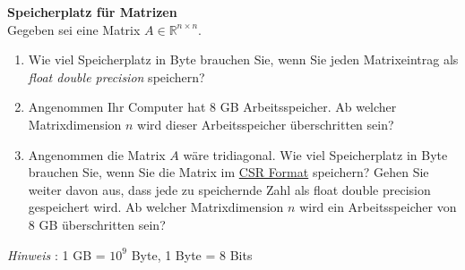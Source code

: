 \textbf{Speicherplatz für Matrizen}\\
Gegeben sei eine Matrix $A \in \mathbb{R}^{n \times n}$. 
\begin{enumerate}
	\item Wie viel Speicherplatz in Byte brauchen Sie, wenn Sie jeden Matrixeintrag als \textit{float double precision} speichern?
	\item Angenommen Ihr Computer hat 8 GB Arbeitsspeicher. Ab welcher Matrixdimension $n$ wird dieser Arbeitsspeicher überschritten sein?
	\item Angenommen die Matrix $A$ wäre tridiagonal. Wie viel Speicherplatz in Byte brauchen Sie, wenn Sie die Matrix im \href{https://en.wikipedia.org/wiki/Sparse_matrix#Compressed_sparse_row_(CSR,_CRS_or_Yale_format)}{CSR Format} speichern? Gehen Sie weiter davon aus, dass jede zu speichernde Zahl als float double precision gespeichert wird. Ab welcher Matrixdimension $n$ wird ein Arbeitsspeicher von 8 GB überschritten sein?
\end{enumerate}

\textit{Hinweis }: 1 GB = $10^9$ Byte, 1 Byte = 8 Bits